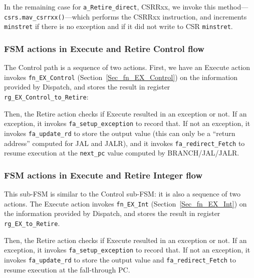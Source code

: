 In the remaining case for {\tt a\_Retire\_direct}, CSRRxx, we invoke
this method---{\tt csrs.mav\_csrrxx()}---which performs the CSRRxx
instruction, and increments \verb|minstret| if there is no exception
and if it did not write to CSR \verb|minstret|.


\subsubsection{FSM actions in Execute and Retire Control flow}

The Control path is a sequence of two actions.  First, we have an
Execute action invokes \verb|fn_EX_Control|
(Section~\ref{Sec_fn_EX_Control}) on the information provided by
Dispatch, and stores the result in register
\verb|rg_EX_Control_to_Retire|:


Then, the Retire action checks if Execute resulted in an exception or
not. If an exception, it invokes \verb|fa_setup_exception| to record
that.  If not an exception, it invokes \verb|fa_update_rd| to store
the output value (this can only be a ``return address'' computed for
JAL and JALR), and it invokes \verb|fa_redirect_Fetch| to resume
execution at the \verb|next_pc| value computed by BRANCH/JAL/JALR.



\subsubsection{FSM actions in Execute and Retire Integer flow}

This sub-FSM is similar to the Control sub-FSM: it is also a sequence
of two actions.  The Execute action invokes \verb|fn_EX_Int|
(Section~\ref{Sec_fn_EX_Int}) on the information provided by Dispatch,
and stores the result in register \verb|rg_EX_to_Retire|.


Then, the Retire action checks if Execute resulted in an exception or
not. If an exception, it invokes \verb|fa_setup_exception| to record
that.  If not an exception, it invokes \verb|fa_update_rd| to store
the output value and \verb|fa_redirect_Fetch| to resume execution at
the fall-through PC.

